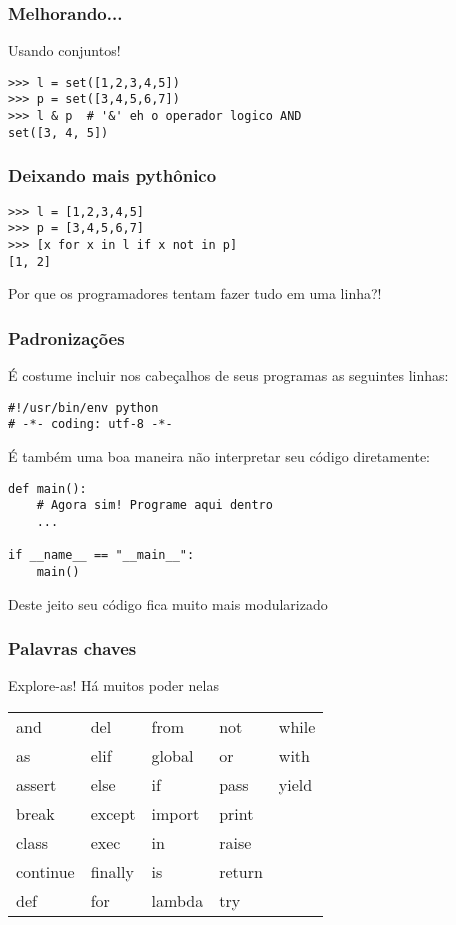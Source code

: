\documentclass{beamer}
\begin{document}
\begin{frame}[containsverbatim]
\frametitle{Melhorando...}
Usando conjuntos!
 \begin{lstlisting}
>>> l = set([1,2,3,4,5])
>>> p = set([3,4,5,6,7])
>>> l & p  # '&' eh o operador logico AND
set([3, 4, 5])
 \end{lstlisting}
\end{frame}

\begin{frame}[containsverbatim]
\frametitle{Deixando mais pythônico}
 \begin{lstlisting}
>>> l = [1,2,3,4,5]
>>> p = [3,4,5,6,7]
>>> [x for x in l if x not in p]
[1, 2]
 \end{lstlisting}
Por que os programadores tentam fazer tudo em uma linha?!
\end{frame}

\begin{frame}[containsverbatim]
\frametitle{Padronizações}
É costume incluir nos cabeçalhos de seus programas as seguintes linhas:
 \begin{lstlisting}
#!/usr/bin/env python
# -*- coding: utf-8 -*-
 \end{lstlisting}
É também uma boa maneira não interpretar seu código diretamente:
 \begin{lstlisting}
def main():
    # Agora sim! Programe aqui dentro
    ...

if __name__ == "__main__":
    main()
 \end{lstlisting}
Deste jeito seu código fica muito mais modularizado
\end{frame}

\begin{frame}
\frametitle{Palavras chaves}
Explore-as! Há muitos poder nelas
  \begin{center}
    \begin{tabular}{lllll}
    and & del & from & not & while \\
    as & elif & global & or & with \\
    assert & else & if & pass & yield \\
    break & except & import & print \\
    class & exec & in & raise \\
    continue & finally & is & return \\
    def & for & lambda & try \\
    \end{tabular}
  \end{center}
\end{frame}
\end{document}
